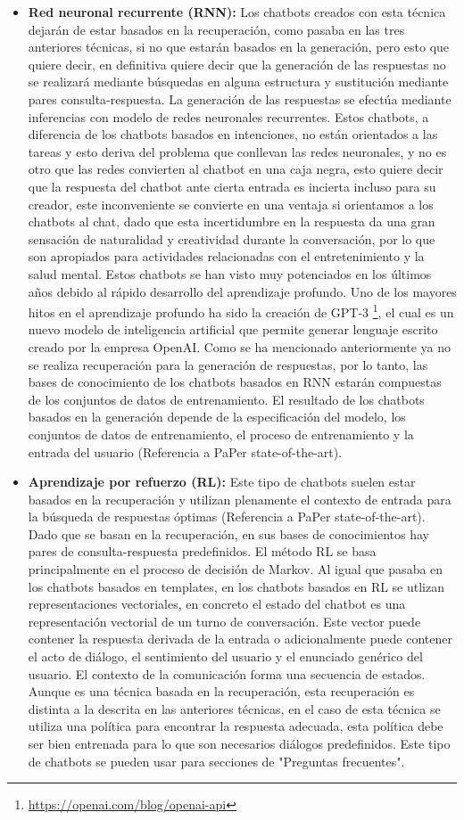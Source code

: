 \begin{itemize}
\item \textbf{Red neuronal recurrente (RNN):} Los chatbots creados con esta técnica dejarán de estar basados en la recuperación, como pasaba en las tres anteriores técnicas, si no que estarán basados en la generación, pero esto que quiere decir, en definitiva quiere decir que la generación de las respuestas no se realizará mediante búsquedas en alguna estructura y sustitución mediante pares consulta-respuesta. La generación de las respuestas se efectúa mediante inferencias con modelo de redes neuronales recurrentes. Estos chatbots, a diferencia de los chatbots basados en intenciones, no están orientados a las tareas y esto deriva del problema que conllevan las redes neuronales, y no es otro que las redes convierten al chatbot en una caja negra, esto quiere decir que la respuesta del chatbot ante cierta entrada es incierta incluso para su creador, este inconveniente se convierte en una ventaja si orientamos a los chatbots al chat, dado que esta incertidumbre en la respuesta da una gran sensación de naturalidad y creatividad durante la conversación, por lo que son apropiados para actividades relacionadas con el entretenimiento y la salud mental. Estos chatbots se han visto muy potenciados en los últimos años debido al rápido desarrollo del aprendizaje profundo. Uno de los mayores hitos en el aprendizaje profundo ha sido la creación de GPT-3 \footnote{\url{https://openai.com/blog/openai-api}}, el cual es un nuevo modelo de inteligencia artificial que permite generar lenguaje escrito creado por la empresa OpenAI. Como se ha mencionado anteriormente ya no se realiza recuperación para la generación de respuestas, por lo tanto, las bases de conocimiento de los chatbots basados en RNN estarán compuestas de los conjuntos de datos de entrenamiento. El resultado de los chatbots basados en la generación depende de la especificación del modelo, los conjuntos de datos de entrenamiento, el proceso de entrenamiento y la entrada del usuario (Referencia a PaPer state-of-the-art).
\item \textbf{Aprendizaje por refuerzo (RL):} Este tipo de chatbots suelen estar basados en la recuperación y utilizan plenamente el contexto de entrada para la búsqueda de respuestas óptimas (Referencia a PaPer state-of-the-art). Dado que se basan en la recuperación, en sus bases de conocimientos hay pares de consulta-respuesta predefinidos. El método RL se basa principalmente en el proceso de decisión de Markov. Al igual que pasaba en los chatbots basados en templates, en los chatbots basados en RL se utlizan representaciones vectoriales, en concreto el estado del chatbot es una representación vectorial de un turno de conversación. Este vector puede contener la respuesta derivada de la entrada o adicionalmente puede contener el acto de diálogo, el sentimiento del usuario y el enunciado genérico del usuario. El contexto de la comunicación forma una secuencia de estados. Aunque es una técnica basada en la recuperación, esta recuperación es distinta a la descrita en las anteriores técnicas, en el caso de esta técnica se utiliza una política para encontrar la respuesta adecuada, esta política debe ser bien entrenada para lo que son necesarios diálogos predefinidos. Este tipo de chatbots se pueden usar para secciones de "Preguntas frecuentes".

\end{itemize}
